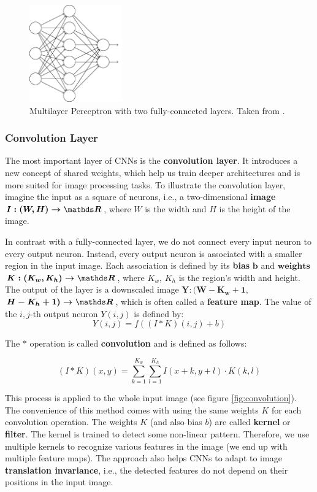 \begin{figure}[h]
    \centering
    \includegraphics[width=4cm]{Sources/Figures/fully_connected_layer.png}
    \caption{Multilayer Perceptron with two fully-connected layers. Taken from \cite{nielsenneural}.}
    \label{fig:fcl}
\end{figure}

\subsubsection{Convolution Layer}
The most important layer of CNNs is the \textbf{convolution layer}. It introduces a new concept of shared weights, which help us train deeper architectures and is more suited for image processing tasks. To illustrate the convolution layer, imagine the input as a square of neurons, i.e., a two-dimensional \textbf{image} $\boldsymbol{I: (W, H) \rightarrow \real}$, where ${W}$ is the width and ${H}$ is the height of the image. 

In contrast with a fully-connected layer, we do not connect every input neuron to every output neuron. Instead, every output neuron is associated with a smaller region in the input image. Each association is defined by its \textbf{bias} $\boldsymbol{b}$ and $\textbf{weights}$ $\boldsymbol{K:(K_w, K_h) \rightarrow \real}$, where $K_w$, $K_h$ is the region's width and height. The output of the layer is a downscaled image $\boldsymbol{Y:(W - K_w + 1,}$ $\boldsymbol{H - K_h + 1)  \rightarrow \real}$, which is often called a \textbf{feature map}. The value of the $i, j$-th output neuron $Y(i,j)$ is defined by: 
$$
Y(i, j) = f\left((I * K)(i,j) + b\right)
$$

The $*$ operation is called \textbf{convolution} and is defined as follows:

$$
(I * K)(x, y) = \sum\limits_{k = 1}^{K_w}\sum\limits_{l = 1}^{K_h} I(x + k, y + l) \cdot K(k, l)
$$

This process is applied to the whole input image (see figure \ref{fig:convolution}). The convenience of this method comes with using the same weights $K$ for each convolution operation. The weights $K$ (and also bias $b$) are called \textbf{kernel} or \textbf{filter}. The kernel is trained to detect some non-linear pattern. Therefore, we use multiple kernels to recognize various features in the image (we end up with multiple feature maps). The approach also helps CNNs to adapt to image \textbf{translation invariance}, i.e., the detected features do not depend on their positions in the input image.

